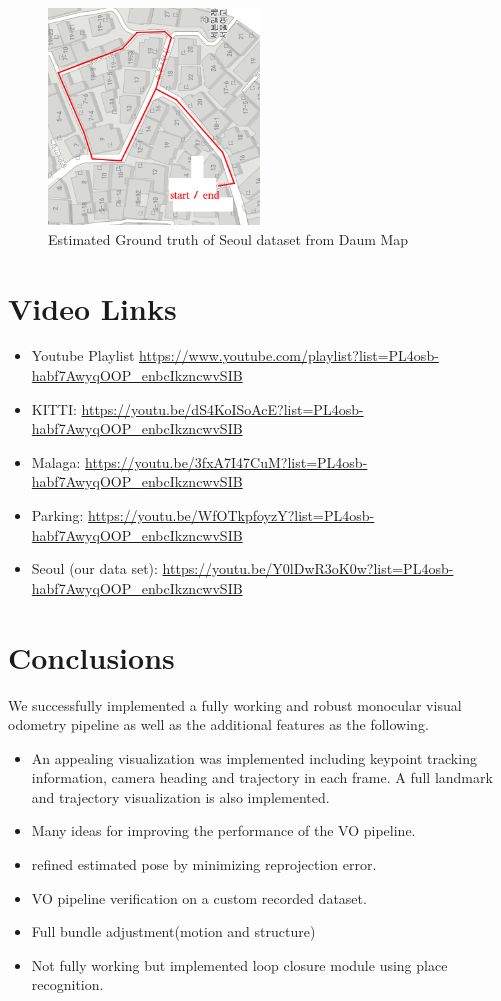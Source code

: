 \begin{figure}[h]
\centering
\includegraphics[width=0.5\textwidth]{seoul_ground.png}
\caption{Estimated Ground truth of Seoul dataset from Daum Map}
\end{figure}

\section*{Video Links}

\begin{itemize}
\item Youtube Playlist \url{https://www.youtube.com/playlist?list=PL4osb-habf7AwyqOOP_enbcIkzncwvSIB}
\item KITTI: \url{https://youtu.be/dS4KoISoAcE?list=PL4osb-habf7AwyqOOP_enbcIkzncwvSIB}
\item Malaga: \url{https://youtu.be/3fxA7I47CuM?list=PL4osb-habf7AwyqOOP_enbcIkzncwvSIB} 
\item Parking: \url{https://youtu.be/WfOTkpfoyzY?list=PL4osb-habf7AwyqOOP_enbcIkzncwvSIB}
\item Seoul (our data set): \url{https://youtu.be/Y0lDwR3oK0w?list=PL4osb-habf7AwyqOOP_enbcIkzncwvSIB}
\end{itemize}

\section{Conclusions}
We successfully implemented a fully working and robust monocular visual odometry pipeline as well as the additional features as the following. 

\begin{itemize}
\item An appealing visualization was implemented including keypoint tracking information, camera heading and trajectory in each frame. A full landmark and trajectory visualization is also implemented.
\item Many ideas for improving the performance of the VO pipeline. 
\item refined estimated pose by minimizing reprojection error.
\item VO pipeline verification on a custom recorded dataset.
\item Full bundle adjustment(motion and structure)
\item Not fully working but implemented loop closure module using place recognition. 
\end{itemize}